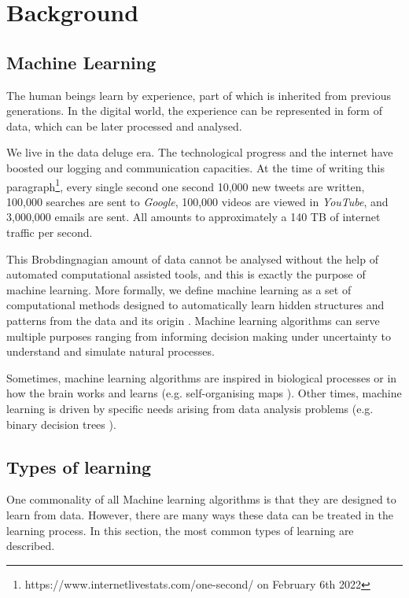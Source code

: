 \chapter{Background} \label{ch:background}
\section{Machine Learning}
The human beings learn by experience, part of which is inherited from previous generations. In the digital world, the experience can be represented in form of data, which can be later processed and analysed.

We live in the data deluge era. The technological progress and the internet have boosted our logging and communication capacities. At the time of writing this paragraph\footnote{https://www.internetlivestats.com/one-second/ on February 6th 2022}, every single second one second 10,000 new tweets are written, 100,000 searches are sent to \textit{Google}, 100,000 videos are viewed in \textit{YouTube}, and 3,000,000 emails are sent. All amounts to approximately a 140 TB of internet traffic per second. 

This Brobdingnagian amount of data cannot be analysed without the help of automated computational assisted tools, and this is exactly the purpose of machine learning. More formally, we define machine learning as a set of computational methods designed to automatically learn hidden structures and patterns from the data and its origin \cite{murphy2012, theodoridis2015}. Machine learning algorithms can serve multiple purposes ranging from informing decision making under uncertainty to understand and simulate natural processes.

Sometimes, machine learning algorithms are inspired in biological processes or in how the brain works and learns \cite{haykin1998} (e.g. self-organising maps \cite{kohonen2001}). Other times, machine learning is driven by specific needs arising from data analysis problems (e.g. binary decision trees \cite{hastie2009, hastie2014}).

\section{Types of learning}
One commonality of all Machine learning algorithms is that they are designed to learn from data. However, there are many ways these data can be treated in the learning process. In this section, the most common types of learning are described.

